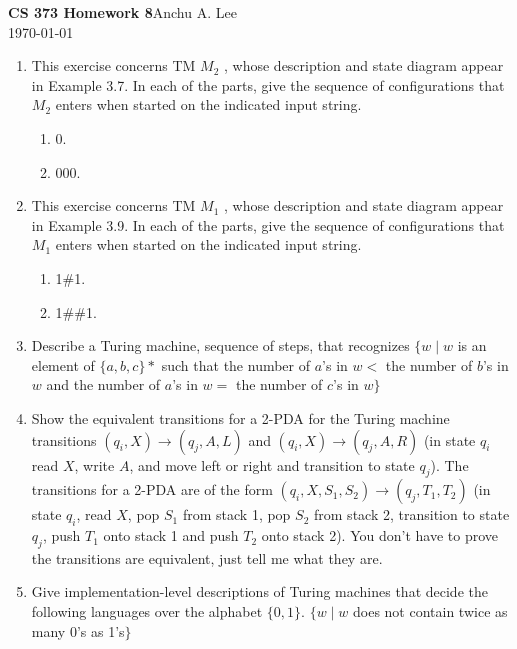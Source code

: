 \documentclass{article}
\begin{document}
    \noindent\textbf{CS 373 Homework 8}\hfill Anchu A. Lee\\
    \noindent\today\\
    \begin{enumerate}
        \item This exercise concerns TM $M_2$ , whose description and state diagram appear in 
        Example 3.7. In each of the parts, give the sequence of configurations that $M_2$ 
        enters when started on the indicated input string.
        \begin{enumerate}[label = (\alph*) ]
            \item 0.
            \item 000.
        \end{enumerate}
        \item  This exercise concerns TM $M_1$ , whose description and state diagram appear in 
        Example 3.9. In each of the parts, give the sequence of configurations that $M_1$ 
        enters when started on the indicated input string.
        \begin{enumerate}[label = (\alph*) ]
            \item 1\#1. 
            \item 1\#\#1.
        \end{enumerate}
        \item Describe a Turing machine, sequence of steps, that recognizes 
        $\{ w \mid w $ is an element of $ \{a, b, 
        c\}* $ such that the number of $a$'s in $w <$ the number of $b$'s in $w$ and the number 
        of $a$'s in $w =$ the number of $c$'s in $w \}$
        \item Show the equivalent transitions for a 2-PDA for the 
        Turing machine transitions $(q_i, X) \rightarrow (q_j, A, L)$ and $(q_i, X) \rightarrow 
        (q_j, A, R)$ (in state $q_i$ read $X$, write $A$, and move left or right and transition to 
        state $q_j$). The transitions for a 2-PDA are of the form $(q_i, X, S_1, S_2) \rightarrow
        (q_j, T_1, T_2)$ (in state $q_i$, read $X$, pop $S_1$ from stack 1, pop $S_2$ from stack 2, 
        transition to state $q_j$, push $T_1$ onto stack 1 and push $T_2$ onto stack 2). You don't 
        have to prove the transitions are equivalent, just tell me what they are.
        \item Give implementation-level descriptions of Turing machines that decide the following 
        languages over the alphabet $\{0,1\}$. $\{w\mid w $ does not contain twice as many 0's as 
        1's$\}$

\end{enumerate}
\end{document}
